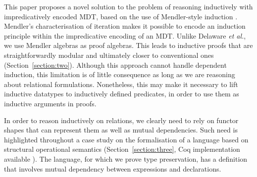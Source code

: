 \documentclass[submission,copyright,creativecommons]{eptcs}
\newcounter{prop}
\begin{document}
This paper proposes a novel solution to the problem of reasoning
inductively with impredicatively encoded MDT, based on the use of
Mendler-style induction
\cite{Mendler91,UustaluV99,AbelMU05}. Mendler's characterisation of
iteration makes it possible to encode an induction principle within
the impredicative encoding of an MDT. Unlike Delaware \emph{et al.},
we use Mendler algebras as proof algebras. This leads to inductive
proofs that are straightforwardly modular and ultimately closer to
conventional ones (Section~\ref{section:two}). Although this approach
cannot handle dependent induction, this limitation is of little
consequence as long as we are reasoning about relational
formulations. Nonetheless, this may make it necessary to lift
inductive datatypes to inductively defined predicates, in order to use
them as inductive arguments in proofs.



In order to reason inductively on relations, we clearly need to rely
on functor shapes that can represent them as well as mutual
dependencies. Such need is highlighted throughout a case study on the
formalisation of a language based on structural operational semantics
(Section~\ref{section:three}, Coq implementation available
\cite{MACoq}). The language, for which we prove type preservation, has
a definition that involves mutual dependency between expressions and
declarations.
\end{document}
